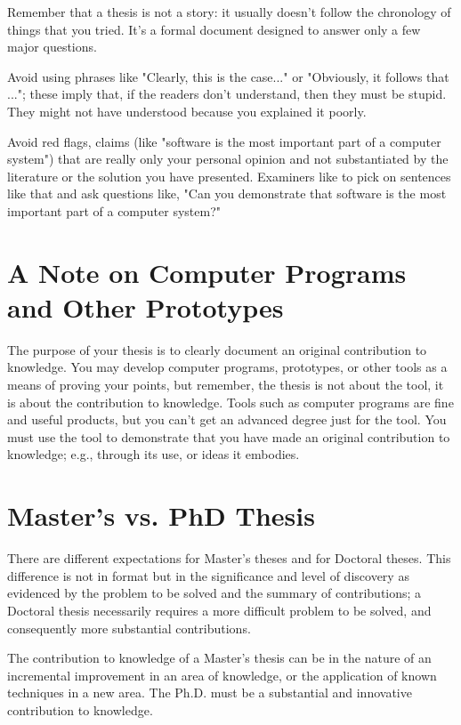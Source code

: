 Remember that a thesis is not a story: it usually doesn't follow the
chronology of things that you tried. It's a formal document designed to answer
only a few major questions.

Avoid using phrases like "Clearly, this is the case..." or "Obviously, it
follows that ..."; these imply that, if the readers don't understand, then
they must be stupid. They might not have understood because you explained it
poorly.

Avoid red flags, claims (like "software is the most important part of a
computer system") that are really only your personal opinion and not
substantiated by the literature or the solution you have presented. Examiners
like to pick on sentences like that and ask questions like, "Can you
demonstrate that software is the most important part of a computer system?"

\section{A Note on Computer Programs and Other Prototypes}
The purpose of your thesis is to clearly document an original contribution to
knowledge. You may develop computer programs, prototypes, or other tools as a
means of proving your points, but remember, the thesis is not about the tool,
it is about the contribution to knowledge. Tools such as computer programs are
fine and useful products, but you can't get an advanced degree just for the
tool. You must use the tool to demonstrate that you have made an original
contribution to knowledge; e.g., through its use, or ideas it embodies.

\section{Master's vs. PhD Thesis}
There are different expectations for Master's theses and for Doctoral theses.
This difference is not in format but in the significance and level of
discovery as evidenced by the problem to be solved and the summary of
contributions; a Doctoral thesis necessarily requires a more difficult problem
to be solved, and consequently more substantial contributions.

The contribution to knowledge of a Master's thesis can be in the nature of an
incremental improvement in an area of knowledge, or the application of known
techniques in a new area. The Ph.D. must be a substantial and innovative
contribution to knowledge.  

